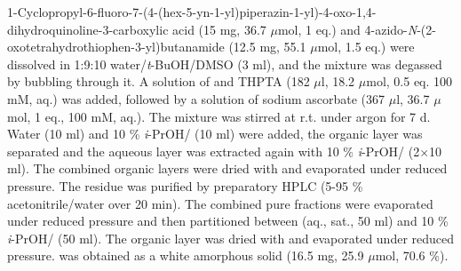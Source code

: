 1-Cyclopropyl-6-fluoro-7-(4-(hex-5-yn-1-yl)piperazin-1-yl)-4-oxo-1,4\hyp{}dihydro\-quinoline-3-carboxylic acid  (15 mg, 36.7 $\mu$mol, 1 eq.) and 
4\hyp{}azido\hyp{}\textit{N}\hyp{}(2\hyp{}oxotetrahydrothiophen\hyp{}3\hyp{}yl)butanamide  (12.5 mg, 55.1 $\mu$mol, 1.5 eq.) 
were dissolved in 1:9:10 water/\textit{t}-BuOH/DMSO (3 ml), and the mixture was degassed by bubbling  through it. 
A solution of  and THPTA (182 $\mu$l, 18.2 $\mu$mol, 0.5 eq. 100 mM, aq.) was added, followed by a solution of sodium ascorbate (367 $\mu$l, 36.7 $\mu$mol, 1 eq., 100 mM, aq.). 
The mixture was stirred at r.t. under argon for 7 d. Water (10 ml) and 10 \% \textit{i}-PrOH/ (10 ml) were added, the organic layer was separated and the aqueous layer was extracted again with 10 \% \textit{i}-PrOH/ (2$\times$10 ml). The combined organic layers were dried with  and evaporated under reduced pressure. The residue was purified by preparatory HPLC (5-95 \% acetonitrile/water over 20 min). 
The combined pure fractions were evaporated under reduced pressure and then partitioned between  (aq., sat., 50 ml) and 10 \% \textit{i}-PrOH/ (50 ml). The organic layer was dried with  and evaporated under reduced pressure.
 was obtained as a white amorphous solid (16.5 mg, 25.9 $\mu$mol, 70.6 \%).
\\[1\baselineskip]
\\[1\baselineskip]

